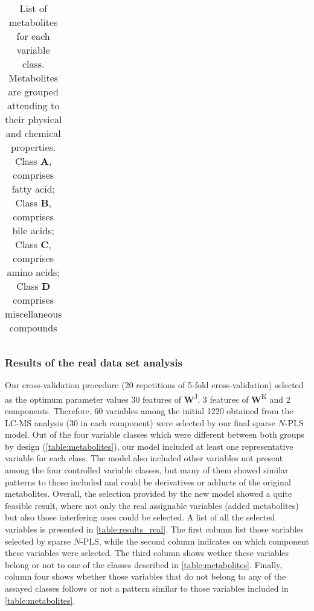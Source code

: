 \begin{table}[hbtp]
{\begin{tabular}{@{}cc@{}}
\end{tabular}}
\caption[List of metabolites for each variable class in the real metabolomics data set used for validation]{List of metabolites for each variable class. Metabolites are grouped attending to their physical and chemical properties. Class \textbf{A}, comprises fatty acid; Class \textbf{B}, comprises bile acids; Class \textbf{C}, comprises amino acids; Class \textbf{D} comprises miscellaneous compounds}
\label{table:metabolites}
\end{table}

\subsubsection{Results of the real data set analysis}
Our cross-validation procedure (20 repetitions of 5-fold cross-validation) selected as the optimum parameter values 30 features of \textbf{W}\textsuperscript{J}, 3 features of \textbf{W}\textsuperscript{K} and 2 components. Therefore, 60 variables among the initial 1220 obtained from the LC-MS analysis (30 in each component) were selected by our final sparse $N$-PLS model. Out of the four variable classes which were different between both groups by design (\autoref{table:metabolites}), our model included at least one representative variable for each class. The model also included other variables not present among the four controlled variable classes, but many of them showed similar patterns to those included and could be derivatives or adducts of the original metabolites. Overall, the selection provided by the new model showed a quite feasible result, where not only the real assignable variables (added metabolites) but also those interfering ones could be selected. A list of all the selected variables is presented in \autoref{table:results_real}. The first column list those variables selected by sparse $N$-PLS, while  the second column indicates on which component these variables were selected. The third column shows wether these variables belong or not to one of the classes described in \autoref{table:metabolites}. Finally, column four shows whether those variables that do not belong to any of the assayed classes follows or not a pattern similar to those variables included in \autoref{table:metabolites}. 
\vspace{10pt}
